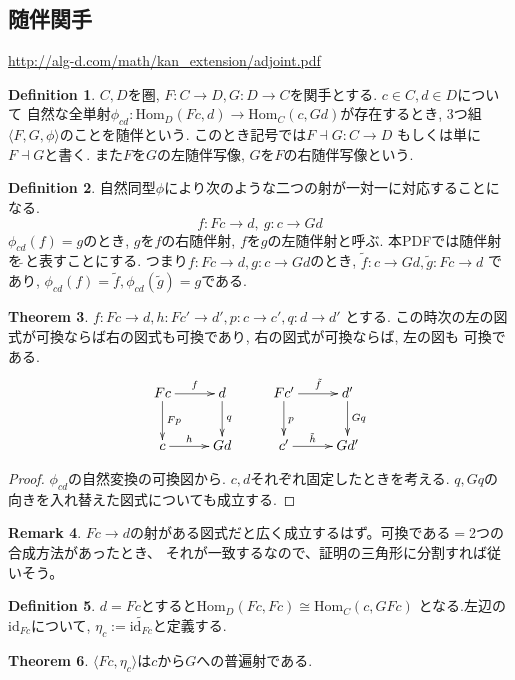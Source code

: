 \documentclass[a4paper,10pt]{article}
\theoremstyle{definition}
\newtheorem{thm}{\bfseries Theorem}[section]
\newtheorem{definition}[thm]{\bfseries Definition}
\newtheorem{remark}[thm]{\bfseries Remark}    %
\begin{document}
\subsection{随伴関手}
\url{http://alg-d.com/math/kan_extension/adjoint.pdf}
\begin{definition}
    $C, D$を圏, $F: C \rightarrow D, G: D \rightarrow C$を関手とする. $c \in C, d \in D$について
    自然な全単射$\phi_{cd}: \mathrm{Hom}_D(Fc, d) \rightarrow \mathrm{Hom}_C(c,Gd)$が存在するとき,
    3つ組$\langle F,G,\phi \rangle$のことを随伴という. このとき記号では$F \dashv G: C \rightarrow D$
    もしくは単に$F \dashv G$と書く. また$F$を$G$の左随伴写像, $G$を$F$の右随伴写像という.
\end{definition}
\begin{definition}
    自然同型$\phi$により次のような二つの射が一対一に対応することになる.
    \[ f:Fc \rightarrow d, \ g:c \rightarrow Gd \]
    $\phi_{cd}(f) = g$のとき, $g$を$f$の右随伴射, $f$を$g$の左随伴射と呼ぶ.
    本PDFでは随伴射を$\tilde{\ }$と表すことにする. つまり$f:Fc \rightarrow d, g:
    c \rightarrow Gd$のとき, $\tilde{f}: c \rightarrow Gd, \tilde{g}: Fc \rightarrow d$
    であり, $\phi_{cd}(f) = \tilde{f}, \phi_{cd}(\tilde{g}) = g$である.
\end{definition}
\begin{thm}
    $f:Fc \rightarrow d, h:Fc' \rightarrow d', p: c \rightarrow c', q: d \rightarrow d'$
    とする. この時次の左の図式が可換ならば右の図式も可換であり, 右の図式が可換ならば, 左の図も
    可換である.
\begin{align*}
\xymatrix{
Fc \ar[r]^-{f} \ar[d]^-{Fp} & d \ar[d]^-{q}& 
Fc'\ar[r]^-{\tilde{f}} \ar[d]^{p} & d' \ar[d]^-{Gq} \\
c \ar[r]^-{h}& Gd
& c'\ar[r]^-{\tilde{h}}& Gd'
}
\end{align*}
\end{thm}
\begin{proof}
    $\phi_{cd}$の自然変換の可換図から. $c,d$それぞれ固定したときを考える.
    $q, Gq$の向きを入れ替えた図式についても成立する.
\end{proof}
\begin{remark}
    $Fc \rightarrow d$の射がある図式だと広く成立するはず。可換である$=$2つの合成方法があったとき、
    それが一致するなので、証明の三角形に分割すれば従いそう。
\end{remark}
\begin{definition}
    $d=Fc$とすると$\textrm{Hom}_D(Fc, Fc) \cong \textrm{Hom}_C(c, GFc)$
    となる.左辺の$\textrm{id}_{Fc}$について, $\eta_{c}:= \widetilde{\textrm{id}_{Fc}}$と定義する.
\end{definition}
\begin{thm}
    $\langle Fc, \eta_{c} \rangle$は$c$から$G$への普遍射である.
\end{thm}
\end{document}
